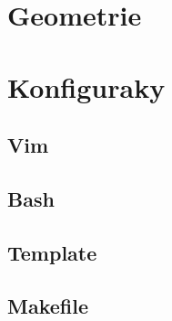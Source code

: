 \documentclass[10pt, a4paper]{article}
\begin{document}
\section{Geometrie}


\newpage

\section{Konfiguraky}
\subsection{Vim}

\subsection{Bash}

\subsection{Template}

\subsection{Makefile}

\end{document}
